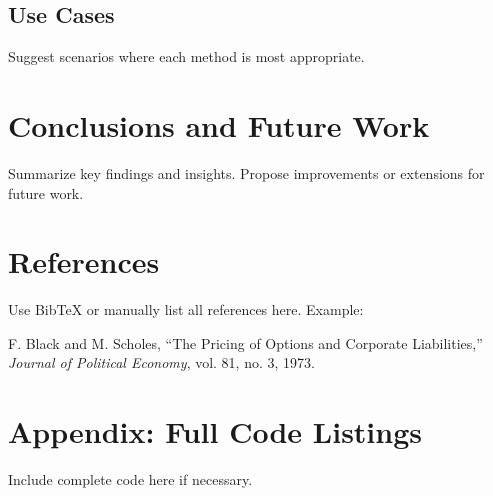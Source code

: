 \documentclass[12pt,a4paper]{report}
\begin{document}
\section{Use Cases}
Suggest scenarios where each method is most appropriate.

\chapter{Conclusions and Future Work}
Summarize key findings and insights. Propose improvements or extensions for future work.

\chapter*{References}
Use BibTeX or manually list all references here. Example:
\begin{thebibliography}{9}
F. Black and M. Scholes, ``The Pricing of Options and Corporate Liabilities,'' \textit{Journal of Political Economy}, vol. 81, no. 3, 1973.
\end{thebibliography}

\appendix
\chapter{Appendix: Full Code Listings}
Include complete code here if necessary.
\end{document}
